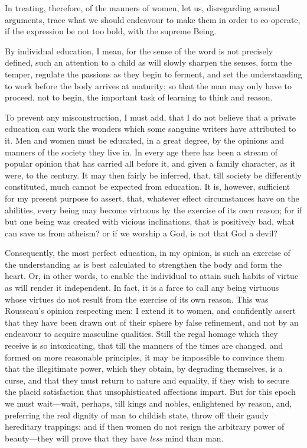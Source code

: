 In treating, therefore, of the manners of women, let us, disregarding
sensual arguments, trace what we should endeavour to make them in
order to co-operate, if the expression be not too bold, with the
supreme Being.

By individual education, I mean, for the sense of the word is not
precisely defined, such an attention to a child as will slowly sharpen
the senses, form the temper, regulate the passions as they begin to
ferment, and set the understanding to work before the body arrives at
maturity; so that the man may only have to proceed, not to begin, the
important task of learning to think and reason.

To prevent any misconstruction, I must add, that I do not believe that
a private education can work the wonders which some sanguine writers
have attributed to it. Men and women must be educated, in a great
degree, by the opinions and manners of the  society they live
in. In every age there has been a stream of popular opinion that has
carried all before it, and given a family character, as it were, to
the century. It may then fairly be inferred, that, till society be
differently constituted, much cannot be expected from education. It
is, however, sufficient for my present purpose to assert, that,
whatever effect circumstances have on the abilities, every being may
become virtuous by the exercise of its own reason; for if but one
being was created with vicious inclinations, that is positively bad,
what can save us from atheism? or if we worship a God, is not that God
a devil?

Consequently, the most perfect education, in my opinion, is such an
exercise of the understanding as is best calculated to strengthen the
body and form the heart. Or, in other words, to enable the individual
to attain such habits of virtue as will render it independent. In
fact, it is a farce to call any being virtuous whose virtues do not
result from the exercise of its own reason. This was Rousseau's
opinion respecting men: I extend it to women, and confidently assert
that they have been drawn out of their sphere by false refinement, and
not by an endeavour to  acquire masculine qualities. Still
the regal homage which they receive is so intoxicating, that till the
manners of the times are changed, and formed on more reasonable
principles, it may be impossible to convince them that the
illegitimate power, which they obtain, by degrading themselves, is a
curse, and that they must return to nature and equality, if they wish
to secure the placid satisfaction that unsophisticated affections
impart. But for this epoch we must wait---wait, perhaps, till kings
and nobles, enlightened by reason, and, preferring the real dignity of
man to childish state, throw off their gaudy hereditary trappings: and
if then women do not resign the arbitrary power of beauty---they will
prove that they have \textit{less} mind than man.

